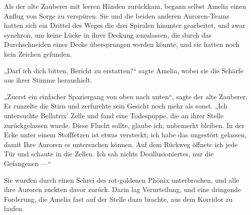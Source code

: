 \later

Als der alte Zauberer mit leeren Händen zurückkam, begann selbst Amelia einen Anflug von Sorge zu verspüren. Sie und die beiden anderen Auroren-Teams hatten sich ein Drittel des Weges die drei Spiralen hinunter gearbeitet, und zwar synchron, um keine Lücke in ihrer Deckung zuzulassen, die durch das Durchschneiden einer Decke übersprungen werden könnte, und sie hatten noch kein Zeichen gefunden.

„Darf ich dich bitten, Bericht zu erstatten?“ sagte Amelia, wobei sie die Schärfe aus ihrer Stimme heraushielt.

„Zuerst ein einfacher Spaziergang von oben nach unten“, sagte der alte Zauberer. Er runzelte die Stirn und zerfurchte sein Gesicht noch mehr als sonst.
„Ich untersuchte Bellatrix’ Zelle und fand eine Todespuppe, die an ihrer Stelle zurückgelassen wurde. Diese Flucht sollte, glaube ich, unbemerkt bleiben. In der Ecke unter einem Stofffetzen ist etwas versteckt; ich habe das ungestört gelassen, damit Ihre Auroren es untersuchen können. Auf dem Rückweg öffnete ich jede Tür und schaute in die Zellen. Ich sah nichts Desillusioniertes, nur die Gefangenen —“

Sie wurden durch einen Schrei des rot-goldenen Phönix unterbrochen, und alle ihre Auroren zuckten davor zurück. Darin lag Verurteilung, und eine dringende Forderung, die Amelia fast auf der Stelle dazu brachte, aus dem Korridor zu laufen.

